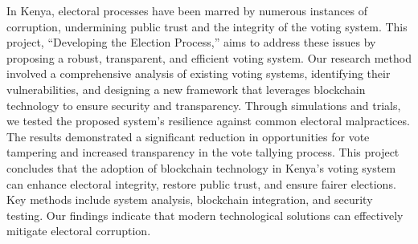 \documentclass[
  12pt,
]{article}
\begin{document}
In Kenya, electoral processes have been marred by numerous instances of
corruption, undermining public trust and the integrity of the voting
system. This project, ``Developing the Election Process,'' aims to
address these issues by proposing a robust, transparent, and efficient
voting system. Our research method involved a comprehensive analysis of
existing voting systems, identifying their vulnerabilities, and
designing a new framework that leverages blockchain technology to ensure
security and transparency. Through simulations and trials, we tested the
proposed system's resilience against common electoral malpractices. The
results demonstrated a significant reduction in opportunities for vote
tampering and increased transparency in the vote tallying process. This
project concludes that the adoption of blockchain technology in Kenya's
voting system can enhance electoral integrity, restore public trust, and
ensure fairer elections. Key methods include system analysis, blockchain
integration, and security testing. Our findings indicate that modern
technological solutions can effectively mitigate electoral corruption.
\end{document}
